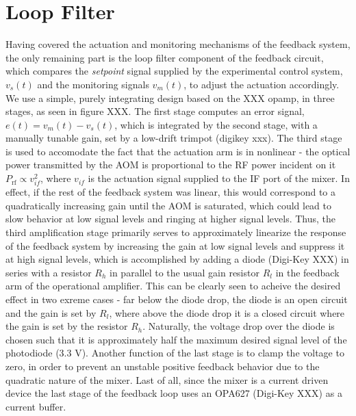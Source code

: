 \documentclass[twocolumn,aps,pra,showpacs,preprintnumbers,bibnotes]{revtex4-1}
\begin{document}
\section{Loop Filter}
Having covered the actuation and monitoring mechanisms of the feedback system, the only remaining part is the loop filter component of the feedback circuit, which compares the \textit{setpoint} signal supplied by the experimental control system, $v_s(t)$ and the monitoring signals $v_m(t)$, to adjust the actuation accordingly.
We use a simple, purely integrating design based on the XXX opamp, in three stages, as seen in figure XXX.
The first stage computes an error signal, $e(t)=v_m(t)-v_s(t)$, which is integrated by the second stage, with a manually tunable gain, set by a low-drift trimpot (digikey xxx). 
The third stage is used to accomodate the fact that the actuation arm is in nonlinear - the optical power transmitted by the AOM is proportional to the RF power incident on it $P_{\mathrm{rf}}\propto v_{if}^2$, where $v_{if}$ is the actuation signal supplied to the IF port of the mixer.
In effect, if the rest of the feedback system was linear, this would correspond to a quadratically increasing gain until the AOM is saturated, which could lead to slow behavior at low signal levels and ringing at higher signal levels.
Thus, the third amplification stage primarily serves to approximately linearize the response of the feedback system by increasing the gain at low signal levels and suppress it at high signal levels, which is accomplished by adding a diode (Digi-Key XXX) in series with a resistor $R_h$ in parallel to the usual gain resistor $R_l$ in the feedback arm of the operational amplifier. 
This can be clearly seen to acheive the desired effect in two exreme cases - far below the diode drop, the diode is an open circuit and the gain is set by $R_l$, where above the diode drop it is a closed circuit where the gain is set by the resistor $R_h$.
Naturally, the voltage drop over the diode is chosen such that it is approximately half the maximum desired signal level of the photodiode (3.3 V).
Another function of the last stage is to clamp the voltage to zero, in order to prevent an unstable positive feedback behavior due to the quadratic nature of the mixer.
Last of all, since the mixer is a current driven device the last stage of the feedback loop uses an OPA627 (Digi-Key XXX) as a current buffer. 
\end{document}
